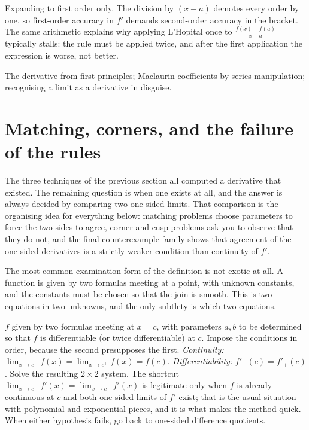 \begin{trap}
Expanding to first order only. The division by $(x-a)$ demotes every order by one, so first-order accuracy in $f'$ demands second-order accuracy in the bracket. The same arithmetic explains why applying L'Hopital once to $\frac{f(x)-f(a)}{x-a}$ typically stalls: the rule must be applied twice, and after the first application the expression is worse, not better.
\end{trap}

\begin{seealsob}The derivative from first principles; Maclaurin coefficients by series manipulation; recognising a limit as a derivative in disguise.\end{seealsob}

\section{Matching, corners, and the failure of the rules}

The three techniques of the previous section all computed a derivative that existed. The remaining question is when one exists at all, and the answer is always decided by comparing two one-sided limits. That comparison is the organising idea for everything below: matching problems choose parameters to force the two sides to agree, corner and cusp problems ask you to observe that they do not, and the final counterexample family shows that agreement of the one-sided derivatives is a strictly weaker condition than continuity of $f'$.

The most common examination form of the definition is not exotic at all. A function is given by two formulas meeting at a point, with unknown constants, and the constants must be chosen so that the join is smooth. This is two equations in two unknowns, and the only subtlety is which two equations.

\cue $f$ given by two formulas meeting at $x=c$, with parameters $a,b$ to be determined so that $f$ is differentiable (or twice differentiable) at $c$.
\method Impose the conditions in order, because the second presupposes the first. \emph{Continuity:} $\lim_{x\to c^{-}}f(x)=\lim_{x\to c^{+}}f(x)=f(c)$. \emph{Differentiability:} $f'_{-}(c)=f'_{+}(c)$. Solve the resulting $2\times2$ system. The shortcut $\lim_{x\to c^{-}}f'(x)=\lim_{x\to c^{+}}f'(x)$ is legitimate only when $f$ is already continuous at $c$ and both one-sided limits of $f'$ exist; that is the usual situation with polynomial and exponential pieces, and it is what makes the method quick. When either hypothesis fails, go back to one-sided difference quotients.

